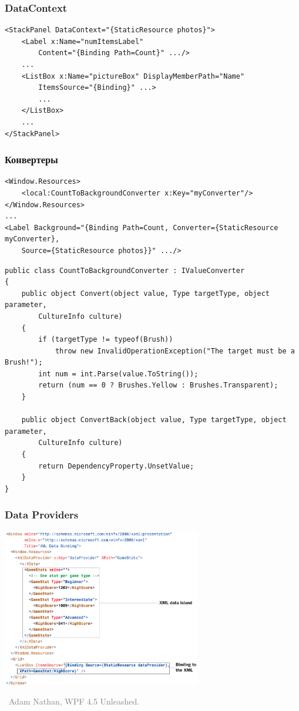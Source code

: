 \documentclass[xetex,mathserif,serif]{beamer}
\newcommand{\attribution}[1] {
\vspace{-5mm}\begin{flushright}\begin{scriptsize}\textcolor{gray}{\textcopyright\, #1}\end{scriptsize}\end{flushright}
}
\begin{document}
	\begin{frame}[fragile]
		\frametitle{DataContext}
		\begin{footnotesize}
			\begin{verbatim}
<StackPanel DataContext="{StaticResource photos}">
    <Label x:Name="numItemsLabel"
        Content="{Binding Path=Count}" .../>
    ...
    <ListBox x:Name="pictureBox" DisplayMemberPath="Name"
        ItemsSource="{Binding}" ...>
        ...
    </ListBox>
    ...
</StackPanel>
			\end{verbatim}
		\end{footnotesize}
	\end{frame}

	\begin{frame}[fragile]
		\frametitle{Конвертеры}
		\begin{ssmall}
			\begin{verbatim}
<Window.Resources>
    <local:CountToBackgroundConverter x:Key="myConverter"/>
</Window.Resources>
...
<Label Background="{Binding Path=Count, Converter={StaticResource myConverter},
    Source={StaticResource photos}}" .../>
			\end{verbatim}
			\vspace{3mm}
			\begin{verbatim}
public class CountToBackgroundConverter : IValueConverter
{
    public object Convert(object value, Type targetType, object parameter,
        CultureInfo culture)
    {
        if (targetType != typeof(Brush))
            throw new InvalidOperationException("The target must be a Brush!");
        int num = int.Parse(value.ToString());
        return (num == 0 ? Brushes.Yellow : Brushes.Transparent);
    }

    public object ConvertBack(object value, Type targetType, object parameter,
        CultureInfo culture)
    {
        return DependencyProperty.UnsetValue;
    }
}
			\end{verbatim}
		\end{ssmall}
	\end{frame}

	\begin{frame}
		\frametitle{Data Providers}
		\begin{center}
			\includegraphics[width=0.65\textwidth]{xmlDataProvider.png}
		\end{center}
		\attribution{Adam Nathan, WPF 4.5 Unleashed.}
	\end{frame}
\end{document}
